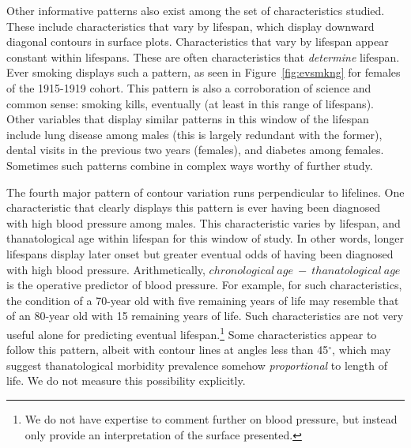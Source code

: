 \documentclass[11pt,oneside]{article} %
\begin{document}
Other informative patterns also exist among the set of characteristics studied.
These include characteristics that vary by lifespan, which display downward
diagonal contours in surface plots. Characteristics that vary by lifespan appear
constant within lifespans. These are often characteristics that \textit{determine} lifespan. Ever smoking displays such a pattern, as seen in
Figure~\ref{fig:evsmkng} for females of the 1915-1919 cohort. This pattern is
also a corroboration of science and common sense: smoking kills, eventually (at
least in this range of lifespans). Other variables that display similar patterns in this
window of the lifespan include lung disease among males (this is largely
redundant with the former), dental visits in the previous two years (females),
and diabetes among females. Sometimes such patterns combine in complex ways worthy of further study.

The fourth major pattern of contour variation runs perpendicular to lifelines.
One characteristic that clearly displays this pattern is ever having been
diagnosed with high blood pressure among males. This characteristic varies by
lifespan, and thanatological age within lifespan for this window of study.
In other words, longer lifespans display later onset but greater eventual odds of
having been diagnosed with high blood pressure. Arithmetically, $chronological~
age~-~thanatological~age$ is the operative predictor of blood pressure. For
example, for such characteristics, the condition of a 70-year old with five
remaining years of life may resemble that of an 80-year old with
15 remaining years of life. Such characteristics are not very useful alone for predicting eventual
lifespan.\footnote{We do not have expertise to comment further on blood
pressure, but instead only provide an interpretation of the surface presented.}
Some characteristics appear to follow this pattern, albeit with contour lines at
angles less than 45$^\circ$, which may suggest thanatological morbidity
prevalence somehow \textit{proportional} to length of life. We do not measure
this possibility explicitly.
\end{document}
